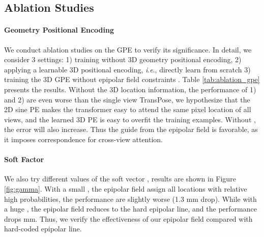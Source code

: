 \documentclass{bmvc2k}
\newcommand{\ie}{\textit{i}.\textit{e}., }
\begin{document}
\vspace{-0.5em}
\subsection{Ablation Studies}
\vspace{-0.5em}
\paragraph{Geometry Positional Encoding}
We conduct ablation studies on the GPE to verify its significance. In detail, we consider 3  settings: 1) training without 3D geometry positional encoding, 2) applying a learnable 3D positional encoding, \ie directly learn  from scratch 3) training the 3D GPE without epipolar field constraints . 
Table \ref{tab:ablation_gpe} presents the results. Without the 3D location information, the performance of 1) and 2) are even worse than the single view TransPose, we hypothesize that the 2D sine PE makes the transformer easy to attend the same pixel location of all views, and the learned 3D PE is easy to overfit the training examples. 
Without , the error will also increase. Thus the guide from the epipolar field is favorable, as it imposes correspondence for cross-view attention. 

\begin{table}[ht!]
\centering
{}
\vspace{-1 em}
\caption{\footnotesize{ Ablation studies on different types of 3D positional encoding } }
\label{tab:ablation_gpe}
\end{table}


\vspace{-1.0 em}
\paragraph{Soft Factor }
We also try different values of the soft vector , results are shown in Figure \ref{fig:gamma}. With a small , the epipolar field assign all locations with relative high probabilities, the performance are slightly worse (1.3 mm drop).  
While with a huge , the epipolar field reduces to the hard epipolar line, and the performance drops  mm. Thus, we verify the effectiveness of our epipolar field compared with hard-coded epipolar line. 
\end{document}

